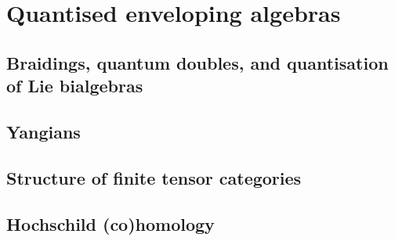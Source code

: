     \part{Quantised enveloping algebras}
        \chapter{Braidings, quantum doubles, and quantisation of Lie bialgebras}
            \begin{abstract}
            
            \end{abstract}
            
            \minitoc
        
            

        \chapter{Yangians}
            \begin{abstract}
            
            \end{abstract}
            
            \minitoc
    
        \begin{appendices}
            \chapter{Structure of finite tensor categories}
                \begin{abstract}
                
                \end{abstract}
                
                \minitoc
            
                
                
                
    
            \chapter{Hochschild (co)homology}
                \begin{abstract}
                
                \end{abstract}
                
                \minitoc
                
        \end{appendices}
	
    \printbibliography

